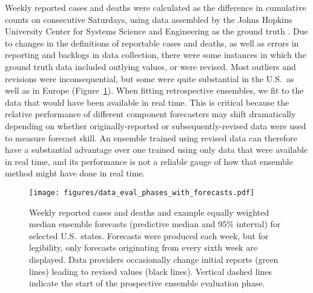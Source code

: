 \documentclass[11pt,3p,authoryear]{elsarticle}
\begin{document}
Weekly reported cases and deaths were calculated as the difference in cumulative counts on consecutive Saturdays, using data assembled by the Johns Hopkins University Center for Systems Science and Engineering as the ground truth \citep{dong_interactive_2020}.
Due to changes in the definitions of reportable cases and deaths, as well as errors in reporting and backlogs in data collection, there were some instances in which the ground truth data included outlying values, or were revised. Most outliers and revisions were inconsequential, but some were quite substantial in the U.S.\ as well as in Europe (Figure~\ref{fig:eval_phase_setup}).
When fitting retrospective ensembles, we fit to the data that would have been available in real time.
This is critical because the relative performance of different component forecasters may shift dramatically depending on whether originally-reported or subsequently-revised data were used to measure forecast skill.
An ensemble trained using revised data can therefore have a substantial advantage over one trained using only data that were available in real time, and its performance is not a reliable gauge of how that ensemble method might have done in real time.

\begin{figure}
\texttt{[image: figures/data\_eval\_phases\_with\_forecasts.pdf]}
\caption{Weekly reported cases and deaths and example equally weighted median ensemble forecasts (predictive median and 95\% interval) for selected U.S.\ states. Forecasts were produced each week, but for legibility, only forecasts originating from every sixth week are displayed. Data providers occasionally change initial reports (green lines) leading to revised values (black lines). Vertical dashed lines indicate the start of the prospective ensemble evaluation phase.}
\label{fig:eval_phase_setup}
\end{figure}
\end{document}
